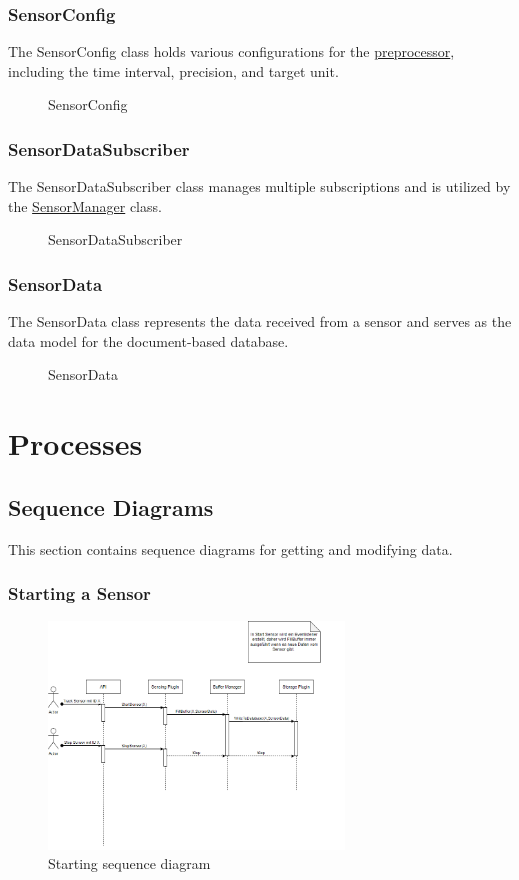 \documentclass[12pt]{article}
\newcounter{fr}
\begin{document}
\subsubsection{SensorConfig}
The SensorConfig class holds various configurations for the \hyperref[fig:bild13]{preprocessor}, including the time interval, precision, and target unit.
\begin{figure}[ht]
\centering

\caption{\label{fig:bild14} SensorConfig}
\end{figure}


\subsubsection{SensorDataSubscriber}
The SensorDataSubscriber class manages multiple subscriptions and is utilized by the \hyperref[fig:bild9]{SensorManager} class.
\begin{figure}[ht]
\centering

\caption{\label{fig:bild15} SensorDataSubscriber}
\end{figure}
\newpage
\subsubsection{SensorData}
The SensorData class represents the data received from a sensor and serves as the data model for the document-based database.
\begin{figure}[ht]
\centering

\caption{\label{fig:bild16} SensorData}
\end{figure}


\section{Processes}
\subsection{Sequence Diagrams}
This section contains sequence diagrams for getting and modifying data.
\subsubsection{Starting a Sensor}
\begin{figure}[ht]
\centering
\includegraphics[width=0.7\textwidth]{Graphics/SeqStart.png}
\caption{\label{fig:bild17} Starting sequence diagram}
\end{figure}
\end{document}
